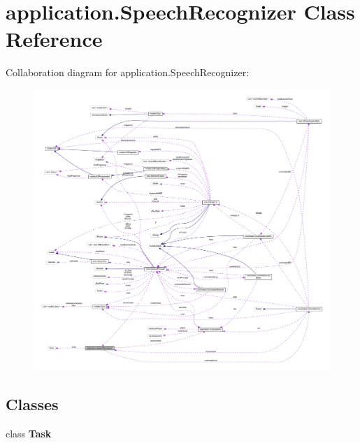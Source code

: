 \hypertarget{classapplication_1_1_speech_recognizer}{}\section{application.\+Speech\+Recognizer Class Reference}
\label{classapplication_1_1_speech_recognizer}


Collaboration diagram for application.\+Speech\+Recognizer\+:
\nopagebreak
\begin{figure}[H]
\begin{center}
\leavevmode
\includegraphics[width=350pt]{classapplication_1_1_speech_recognizer__coll__graph}
\end{center}
\end{figure}
\subsection*{Classes}
\begin{DoxyCompactItemize}
\item 
class {\bfseries Task}
\end{DoxyCompactItemize}
